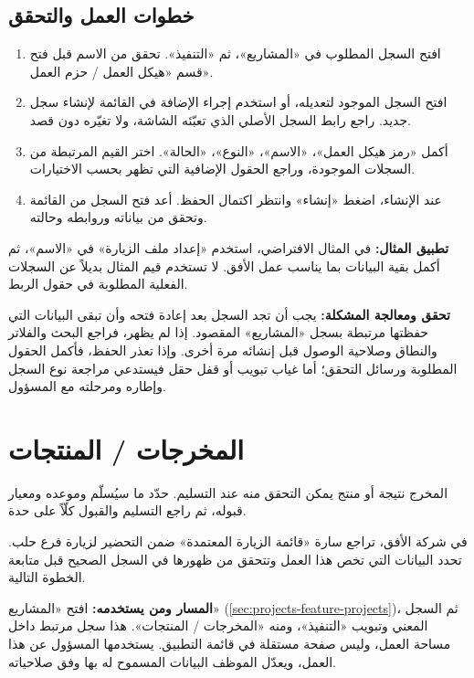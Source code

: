 \subsection{خطوات العمل والتحقق}
\begin{enumerate}
\item افتح السجل المطلوب في «المشاريع»، ثم «التنفيذ». تحقق من الاسم قبل فتح قسم «هيكل العمل / حزم العمل».
\item افتح السجل الموجود لتعديله، أو استخدم إجراء الإضافة في القائمة لإنشاء سجل جديد. راجع رابط السجل الأصلي الذي تعبّئه الشاشة، ولا تغيّره دون قصد.
\item أكمل «رمز هيكل العمل»، «الاسم»، «النوع»، «الحالة». اختر القيم المرتبطة من السجلات الموجودة، وراجع الحقول الإضافية التي تظهر بحسب الاختيارات.
\item عند الإنشاء، اضغط «إنشاء» وانتظر اكتمال الحفظ. أعد فتح السجل من القائمة وتحقق من بياناته وروابطه وحالته.
\end{enumerate}

\textbf{تطبيق المثال:} في المثال الافتراضي، استخدم «إعداد ملف الزيارة» في «الاسم»، ثم أكمل بقية البيانات بما يناسب عمل الأفق. لا تستخدم قيم المثال بديلاً عن السجلات الفعلية المطلوبة في حقول الربط.

\textbf{تحقق ومعالجة المشكلة:} يجب أن تجد السجل بعد إعادة فتحه وأن تبقى البيانات التي حفظتها مرتبطة بسجل «المشاريع» المقصود. إذا لم يظهر، فراجع البحث والفلاتر والنطاق وصلاحية الوصول قبل إنشائه مرة أخرى. وإذا تعذر الحفظ، فأكمل الحقول المطلوبة ورسائل التحقق؛ أما غياب تبويب أو قفل حقل فيستدعي مراجعة نوع السجل وإطاره ومرحلته مع المسؤول.

\clearpage
\section{المخرجات / المنتجات}
\label{sec:projects-feature-deliverables}

المخرج نتيجة أو منتج يمكن التحقق منه عند التسليم. حدّد ما سيُسلّم وموعده ومعيار قبوله، ثم راجع التسليم والقبول كلّاً على حدة.

\begin{rcnote}
في شركة الأفق، تراجع سارة «قائمة الزيارة المعتمدة» ضمن التحضير لزيارة فرع حلب. تحدد البيانات التي تخص هذا العمل وتتحقق من ظهورها في السجل الصحيح قبل متابعة الخطوة التالية.
\end{rcnote}

\textbf{المسار ومن يستخدمه:} افتح «المشاريع» (\ref{sec:projects-feature-projects})، ثم السجل المعني وتبويب «التنفيذ»، ومنه «المخرجات / المنتجات». هذا سجل مرتبط داخل مساحة العمل، وليس صفحة مستقلة في قائمة التطبيق. يستخدمها المسؤول عن هذا العمل، ويعدّل الموظف البيانات المسموح له بها وفق صلاحياته.

